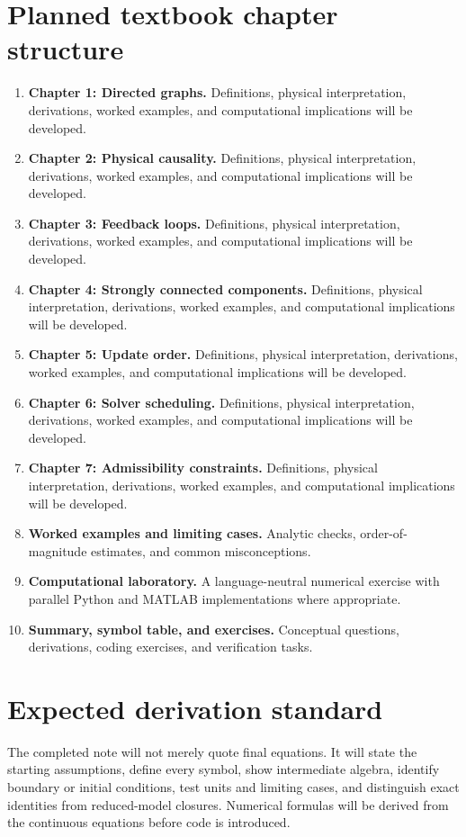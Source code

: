 \documentclass[11pt]{article}
\begin{document}
\section{Planned textbook chapter structure}
\begin{enumerate}[leftmargin=1.8em]
\item \textbf{Chapter 1: Directed graphs.} Definitions, physical interpretation, derivations, worked examples, and computational implications will be developed.
\item \textbf{Chapter 2: Physical causality.} Definitions, physical interpretation, derivations, worked examples, and computational implications will be developed.
\item \textbf{Chapter 3: Feedback loops.} Definitions, physical interpretation, derivations, worked examples, and computational implications will be developed.
\item \textbf{Chapter 4: Strongly connected components.} Definitions, physical interpretation, derivations, worked examples, and computational implications will be developed.
\item \textbf{Chapter 5: Update order.} Definitions, physical interpretation, derivations, worked examples, and computational implications will be developed.
\item \textbf{Chapter 6: Solver scheduling.} Definitions, physical interpretation, derivations, worked examples, and computational implications will be developed.
\item \textbf{Chapter 7: Admissibility constraints.} Definitions, physical interpretation, derivations, worked examples, and computational implications will be developed.
\item \textbf{Worked examples and limiting cases.} Analytic checks, order-of-magnitude estimates, and common misconceptions.
\item \textbf{Computational laboratory.} A language-neutral numerical exercise with parallel Python and MATLAB implementations where appropriate.
\item \textbf{Summary, symbol table, and exercises.} Conceptual questions, derivations, coding exercises, and verification tasks.
\end{enumerate}

\section{Expected derivation standard}
The completed note will not merely quote final equations. It will state the starting assumptions, define every symbol, show intermediate algebra, identify boundary or initial conditions, test units and limiting cases, and distinguish exact identities from reduced-model closures. Numerical formulas will be derived from the continuous equations before code is introduced.
\end{document}

